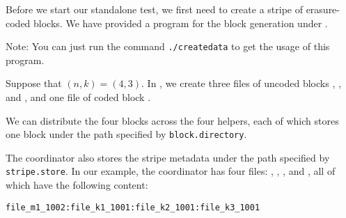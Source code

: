 \documentclass[letterpaper,12pt]{article}
\begin{document}
Before we start our standalone test, we first need to create a stripe of
erasure-coded blocks. We have provided a program for the block generation
under .

%
%


\begin{center}
\noindent{}
\end{center}

Note: You can just run the command {\tt ./createdata} to get the usage of this program.

Suppose that $(n,k)=(4,3)$.  In , we create three files of
uncoded blocks , , and , and one
file of coded block .

We can distribute the four blocks across the four helpers, each of which
stores one block under the path specified by {\tt block.directory}.

%

The coordinator also stores the stripe metadata under the path specified by
{\tt stripe.store}.  In our example, the coordinator has four files:
, , , and
, all of which have the following content:
\begin{center}
{\tt file\_m1\_1002:file\_k1\_1001:file\_k2\_1001:file\_k3\_1001}
\end{center}
\end{document}
